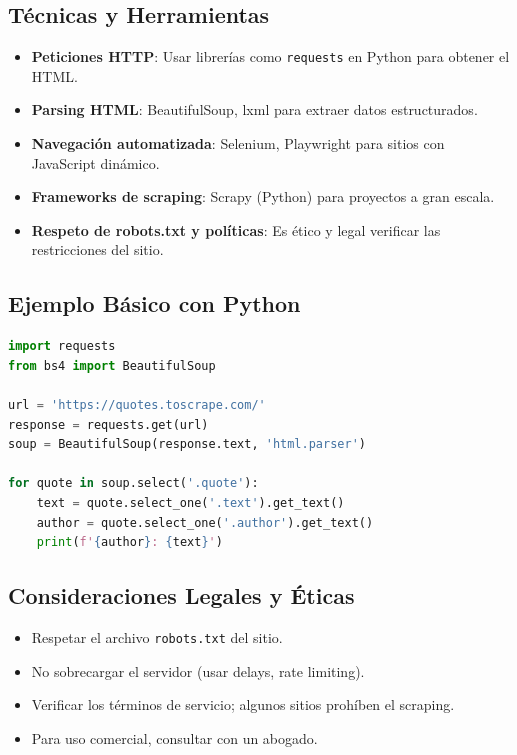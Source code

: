 \documentclass[12pt,a4paper,openany,oneside]{book}
\begin{document}
\subsection{Técnicas y Herramientas}
\begin{itemize}
    \item \textbf{Peticiones HTTP}: Usar librerías como \texttt{requests} en Python para obtener el HTML.
    \item \textbf{Parsing HTML}: BeautifulSoup, lxml para extraer datos estructurados.
    \item \textbf{Navegación automatizada}: Selenium, Playwright para sitios con JavaScript dinámico.
    \item \textbf{Frameworks de scraping}: Scrapy (Python) para proyectos a gran escala.
    \item \textbf{Respeto de robots.txt y políticas}: Es ético y legal verificar las restricciones del sitio.
\end{itemize}

\subsection{Ejemplo Básico con Python}
\begin{lstlisting}[language=Python]
import requests
from bs4 import BeautifulSoup

url = 'https://quotes.toscrape.com/'
response = requests.get(url)
soup = BeautifulSoup(response.text, 'html.parser')

for quote in soup.select('.quote'):
    text = quote.select_one('.text').get_text()
    author = quote.select_one('.author').get_text()
    print(f'{author}: {text}')
\end{lstlisting}

\subsection{Consideraciones Legales y Éticas}
\begin{itemize}
    \item Respetar el archivo \texttt{robots.txt} del sitio.
    \item No sobrecargar el servidor (usar delays, rate limiting).
    \item Verificar los términos de servicio; algunos sitios prohíben el scraping.
    \item Para uso comercial, consultar con un abogado.
\end{itemize}
\end{document}
